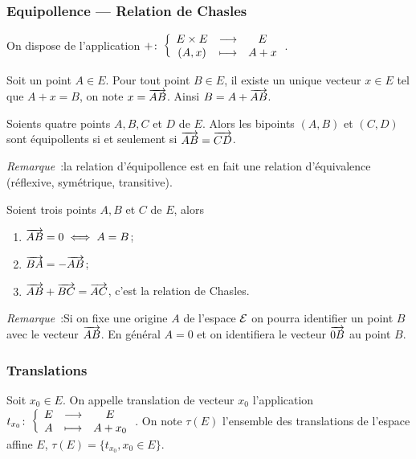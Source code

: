 \subsubsection{Equipollence --- Relation de Chasles}

On dispose de l'application \(+\colon\left\{\begin{array}{ccc}E\times E & \longrightarrow &E\\(A,x) & \longmapsto & A+x\end{array}\right.\).

\begin{defdef}
  Soit un point \(A \in E\). Pour tout point \(B \in E\), il existe un unique
  vecteur \(x \in E\) tel que \(A+x=B\), on note \(x=\overrightarrow{AB}\). Ainsi
  \(B=A+\overrightarrow{AB}\).
\end{defdef}
\begin{defdef}
  Soients quatre points \(A,B,C\) et \(D\) de \(E\). Alors les bipoints
  \((A,B)\) et \((C,D)\) sont équipollents si et seulement si
  \(\overrightarrow{AB}=\overrightarrow{CD}\).
\end{defdef}

\emph{Remarque}~:la relation d'équipollence est en fait une relation
d'équivalence (réflexive, symétrique, transitive).

\begin{prop}
  Soient trois points \(A,B\) et \(C\) de \(E\), alors
  \begin{enumerate}
    \item \(\overrightarrow{AB}=0 \iff A=B\);
    \item \(\overrightarrow{BA}=-\overrightarrow{AB}\);
    \item \(\overrightarrow{AB}+\overrightarrow{BC}=\overrightarrow{AC}\), c'est la relation de Chasles.
  \end{enumerate}
\end{prop}

\emph{Remarque}~:Si on fixe une origine \(A\) de l'espace \(\mathcal{E}\) on pourra
identifier un point \(B\) avec le vecteur \(\overrightarrow{AB}\). En général \(A=0\) et
on identifiera le vecteur \(\overrightarrow{0B}\) au point \(B\).

\subsubsection{Translations}

\begin{defdef}
  Soit \(x_0 \in E\). On appelle translation de vecteur \(x_0\) l'application
  \(t_{x_0}\colon\left\{\begin{array}{ccc}E & \longrightarrow &E\\A & \longmapsto & A+x_0\end{array}\right.\). On note \(\tau(E)\) l'ensemble des
  translations de l'espace affine \(E\), \(\tau(E)=\{t_{x_0}, x_0 \in E\}\).
\end{defdef}

